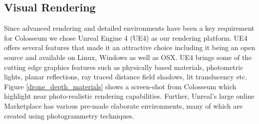 \documentclass[graybox]{svmult}
\begin{document}
	\subsection{Visual Rendering}
	
	Since advanced rendering and detailed environments have been a key requirement for Colosseum we chose Unreal Engine 4 (UE4) \cite{karis2013real} as our rendering platform. UE4 offers several features that made it an attractive choice including it being an open source and available on Linux, Windows as well as OSX. UE4 brings some of the cutting edge graphics features such as physically based materials, photometric lights, planar reflections, ray traced distance field shadows, lit translucency etc. Figure \ref{drone_depth_materials} shows a screen-shot from Colosseum which highlight near photo-realistic rendering capabilities. Further, Unreal's large online Marketplace has various pre-made elaborate environments, many of which are created using photogrammetry techniques.
	
	
\end{document}
